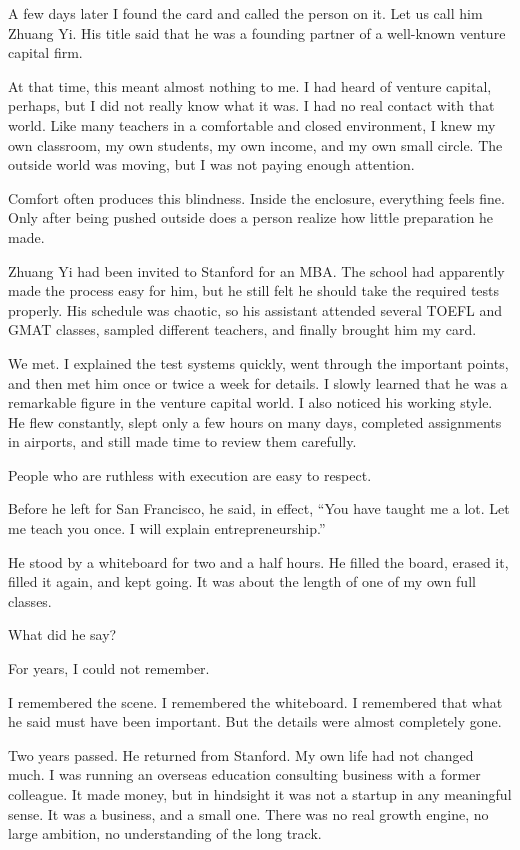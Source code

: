 A few days later I found the card and called the person on it. Let us call him Zhuang Yi. His title said that he was a founding partner of a well-known venture capital firm.

At that time, this meant almost nothing to me. I had heard of venture capital, perhaps, but I did not really know what it was. I had no real contact with that world. Like many teachers in a comfortable and closed environment, I knew my own classroom, my own students, my own income, and my own small circle. The outside world was moving, but I was not paying enough attention.

Comfort often produces this blindness. Inside the enclosure, everything feels fine. Only after being pushed outside does a person realize how little preparation he made.

Zhuang Yi had been invited to Stanford for an MBA. The school had apparently made the process easy for him, but he still felt he should take the required tests properly. His schedule was chaotic, so his assistant attended several TOEFL and GMAT classes, sampled different teachers, and finally brought him my card.

We met. I explained the test systems quickly, went through the important points, and then met him once or twice a week for details. I slowly learned that he was a remarkable figure in the venture capital world. I also noticed his working style. He flew constantly, slept only a few hours on many days, completed assignments in airports, and still made time to review them carefully.

People who are ruthless with execution are easy to respect.

Before he left for San Francisco, he said, in effect, ``You have taught me a lot. Let me teach you once. I will explain entrepreneurship.''

He stood by a whiteboard for two and a half hours. He filled the board, erased it, filled it again, and kept going. It was about the length of one of my own full classes.

What did he say?

For years, I could not remember.

I remembered the scene. I remembered the whiteboard. I remembered that what he said must have been important. But the details were almost completely gone.

Two years passed. He returned from Stanford. My own life had not changed much. I was running an overseas education consulting business with a former colleague. It made money, but in hindsight it was not a startup in any meaningful sense. It was a business, and a small one. There was no real growth engine, no large ambition, no understanding of the long track.

